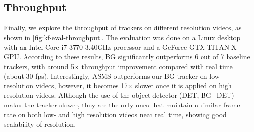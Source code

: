 



\subsection{Throughput}
Finally, we explore the throughput of trackers on different resolution videos, as shown in \ref{fig:kf-eval-throughput}.
The evaluation was done on a Linux desktop with an Intel Core i7-3770 3.40GHz processor and a GeForce GTX TITAN X GPU.
According to these results, BG significantly outperforms 6 out of 7 baseline trackers, with around 5$\times$ throughput improvement compared with real time (about 30 fps). Interestingly, ASMS outperforms our BG tracker on low resolution videos, however, it becomes 17$\times$ slower once it is applied on high resolution videos. Although the use of the object detector (DET, BG+DET) makes the tracker slower, they are the only ones that maintain a similar frame rate on both low- and high resolution videos near real time, showing good scalability of resolution.

